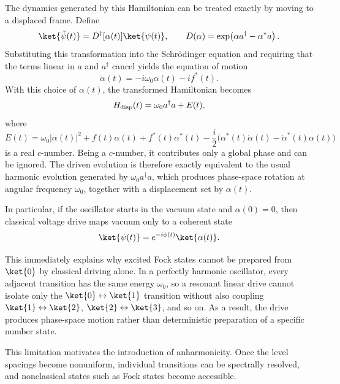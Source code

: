 The dynamics generated by this Hamiltonian can be treated exactly by moving to a displaced frame. Define
\begin{equation}
    \ket{\tilde \psi(t)}
    =
    D^\dagger[\alpha(t)] \ket{\psi(t)},
    \qquad
    D(\alpha)
    =
    \exp\!\left(\alpha a^\dagger - \alpha^* a\right).
\end{equation}
Substituting this transformation into the Schr\"odinger equation and requiring that the terms linear in $a$ and $a^\dagger$ cancel yields the equation of motion
\begin{equation}
    \dot \alpha(t)
    =
    -i\omega_0 \alpha(t) - i f^*(t).
\end{equation}
With this choice of $\alpha(t)$, the transformed Hamiltonian becomes
\begin{equation}
    H_{\rm disp}(t)
    =
    \omega_0 a^\dagger a
    +
    E(t),
\end{equation}
where
\begin{equation}
    E(t)
    =
    \omega_0 |\alpha(t)|^2
    +
    f(t)\alpha(t)
    +
    f^*(t)\alpha^*(t)
    -
    \frac{i}{2}
    \bigl(\alpha^*(t)\dot\alpha(t) - \dot\alpha^*(t)\alpha(t)\bigr)
\end{equation}
is a real $c$-number. Being a $c$-number, it contributes only a global phase and can be ignored. The driven evolution is therefore exactly equivalent to the usual harmonic evolution generated by $\omega_0 a^\dagger a$, which produces phase-space rotation at angular frequency $\omega_0$, together with a displacement set by $\alpha(t)$.

In particular, if the oscillator starts in the vacuum state and $\alpha(0)=0$, then classical voltage drive maps vacuum only to a coherent state
\begin{equation}
    \ket{\psi(t)}
    =
    e^{-i\phi(t)} \ket{\alpha(t)}.
\end{equation}

This immediately explains why excited Fock states cannot be prepared from $\ket{0}$ by classical driving alone. In a perfectly harmonic oscillator, every adjacent transition has the same energy $\omega_0$, so a resonant linear drive cannot isolate only the $\ket{0}\leftrightarrow\ket{1}$ transition without also coupling $\ket{1}\leftrightarrow\ket{2}$, $\ket{2}\leftrightarrow\ket{3}$, and so on. As a result, the drive produces phase-space motion rather than deterministic preparation of a specific number state.

This limitation motivates the introduction of anharmonicity. Once the level spacings become nonuniform, individual transitions can be spectrally resolved, and nonclassical states such as Fock states become accessible.

